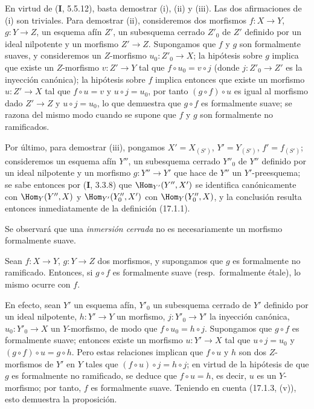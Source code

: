 En virtud de (\textbf I, 5.5.12), basta demostrar (i), (ii) y (iii). Las dos afirmaciones de (i) son triviales. Para demostrar (ii), consideremos dos morfismos $f:X\to Y$, $g:Y\to Z$, un esquema afín $Z'$, un subesquema cerrado $Z'_0$ de $Z'$ definido por un ideal nilpotente y un morfismo $Z'\to Z$. Supongamos que $f$ y $g$ son formalmente suaves, y consideremos un
$Z$-morfismo $u_0:Z'_0\to X$; la hipótesis sobre $g$ implica que existe un $Z$-morfismo $v:Z'\to Y$ tal que $f\circ u_0=v\circ j$ (donde $j:Z'_0\to Z'$ es la inyección canónica); la hipótesis sobre $f$ implica entonces que existe un morfismo $u:Z'\to X$ tal que $f\circ u=v$ y $u\circ j=u_0$, por tanto $(g\circ f)\circ u$ es igual al morfismo dado $Z'\to Z$ y $u\circ j=u_0$, lo que demuestra que $g\circ f$ es formalmente suave; se razona del mismo modo cuando se supone que $f$ y $g$ son formalmente no ramificados.

Por último, para demostrar (iii), pongamos $X'=X_{(S')}$, $Y'=Y_{(S')}$, $f'=f_{(S')}$; consideremos un esquema afín $Y''$, un subesquema cerrado $Y''_0$ de $Y''$ definido por un ideal nilpotente y un morfismo $g:Y''\to Y'$ que hace de $Y''$ un $Y'$-preesquema; se sabe entonces por (\textbf I, 3.3.8) que $\Hom_{Y'}(Y'',X')$ se identifica canónicamente con $\Hom_Y(Y'',X)$ y $\Hom_{Y'}(Y''_0,X')$ con $\Hom_Y(Y''_0,X)$, y la conclusión resulta entonces inmediatamente de la definición (17.1.1).

Se observará que una \emph{inmersión cerrada} no es necesariamente un morfismo formalmente suave.

\begin{proposition}[17.1.4]
\label{IV.17.1.4}
Sean $f:X\to Y$, $g:Y\to Z$ dos morfismos, y supongamos que $g$ es formalmente no ramificado. Entonces, si $g\circ f$ es formalmente suave \textup{(resp.}\ formalmente étale\textup{)}, lo mismo ocurre con $f$.
\end{proposition}

En efecto, sean $Y'$ un esquema afín, $Y'_0$ un subesquema cerrado de $Y'$ definido por un ideal nilpotente, $h:Y'\to Y$ un morfismo, $j:Y'_0\to Y'$ la inyección canónica, $u_0:Y'_0\to X$ un $Y$-morfismo, de modo que $f\circ u_0=h\circ j$. Supongamos que $g\circ f$ es formalmente suave; entonces existe un morfismo $u:Y'\to X$ tal que $u\circ j=u_0$ y $(g\circ f)\circ u=g\circ h$. Pero estas relaciones implican que $f\circ u$ y $h$ son dos $Z$-morfismos de $Y'$ en $Y$ tales que $(f\circ u)\circ j=h\circ j$; en virtud de la hipótesis de que $g$ es formalmente no ramificado, se deduce que $f\circ u=h$, es decir, $u$ es un $Y$-morfismo; por tanto, $f$ es formalmente suave. Teniendo en cuenta (17.1.3, (v)), esto demuestra la proposición.

